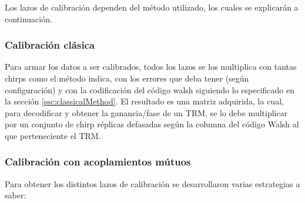 Los lazos de calibración dependen del método utilizado, los cuales se explicarán a continuación.

\subsubsection{Calibración clásica}
Para armar los datos a ser calibrados, todos los lazos se los multiplica con tantas chirps como el método indica, con los errores
que deba tener (según configuración) y con la codificación del código walsh siguiendo lo especificado en la sección 
\ref{ssc:classicalMethod}. El resultado es una matriz adquirida, la cual, para decodificar y obtener la ganancia/fase de un TRM,
se lo debe multiplicar por un conjunto de chirp réplicas defasadas según la columna del código Walsh al que perteneciente el TRM. 

\subsubsection{Calibración con acoplamientos mútuos}

Para obtener los distintos lazos de calibración se desarrollaron varias estrategias a saber: 

